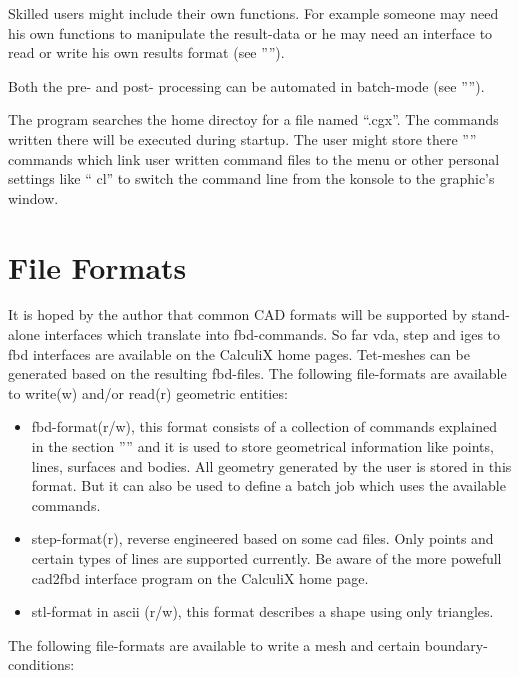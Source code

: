 \documentclass{article}
\begin{document}
Skilled users might include their own functions. For example someone may need his own functions to manipulate the result-data or he may need an interface to read or write his own results format (see '''').

Both the pre- and post- processing can be automated in batch-mode (see '''').

The program searches the home directoy for a file named ``.cgx''. The commands written there will be executed during startup. The user might store there '''' commands which link user written command files to the menu or other personal settings like `` cl'' to switch the command line from the konsole to the graphic's window. 

\section{\label{File Formats}File Formats}
It is hoped by the author that common CAD formats will be supported by stand-alone interfaces which translate into fbd-commands. So far vda, step and iges to fbd interfaces are available on the CalculiX home pages. Tet-meshes can be generated based on the resulting fbd-files. The following file-formats are available to write(w) and/or read(r) geometric entities:
\begin{itemize}
\item fbd-format(r/w), this format consists of a collection of commands explained in the section '''' and it is used to store geometrical information like points, lines, surfaces and bodies. All geometry generated by the user is stored in this format. But it can also be used to define a batch job which uses the available commands.
\item step-format(r), reverse engineered based on some cad files. Only points and certain types of lines are supported currently. Be aware of the more powefull cad2fbd interface program on the CalculiX home page.
\item stl-format in ascii (r/w), this format describes a shape using only triangles.
\end{itemize}
The following file-formats are available to write a mesh and certain boundary-conditions:
\end{document}
